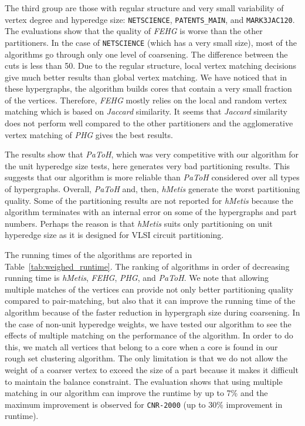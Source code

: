 \documentclass[twocolumn]{svjour3}          \smartqed
\begin{document}
The third group are those with regular structure and very small variability of vertex degree and hyperedge size: \texttt{NETSCIENCE}, \texttt{PATENTS\_MAIN}, and \texttt{MARK3JAC120}. The evaluations show that the quality of \textit{FEHG} is worse than the other partitioners. In the case of \texttt{NETSCIENCE} (which has a very small size), most of the algorithms go through only one level of coarsening. The difference between the cuts is less than 50. Due to the regular structure, local vertex matching decisions give much better results than global vertex matching. We have noticed that in these hypergraphs, the algorithm builds cores that contain a very small fraction of the vertices. Therefore, \textit{FEHG} mostly relies on the local and random vertex matching which is based on \textit{Jaccard} similarity. It seems that \textit{Jaccard} similarity does not perform well compared to the other partitioners and the agglomerative vertex matching of \textit{PHG} gives the best results. 

The results show that \textit{PaToH}, which was very competitive with our algorithm for the unit hyperedge size tests, here generates very bad partitioning results. This suggests that our algorithm is more reliable than \textit{PaToH} considered over all types of hypergraphs. Overall, \textit{PaToH} and, then, \textit{hMetis} generate the worst partitioning quality. Some of the partitioning results are not reported for \textit{hMetis} because the algorithm  terminates with an internal error on some of the hypergraphs and part numbers. Perhaps the reason is that \textit{hMetis} suits only partitioning on unit hyperedge size as it is designed for VLSI circuit partitioning.


The running times of the algorithms are reported in Table~\ref{tab:weighed_runtime}. The ranking of algorithms in order of decreasing running time is \textit{hMetis}, \textit{FEHG}, \textit{PHG}, and \textit{PaToH}. 
We note that allowing multiple matches of the vertices can provide not only better partitioning quality compared to pair-matching, but also that it can improve the running time of the algorithm because of the faster reduction in hypergraph size during coarsening. In the case of non-unit hyperedge weights, we have tested our algorithm to see the effects of multiple matching on the performance of the algorithm. In order to do this, we match all vertices that belong to a core when a core is found in our rough set clustering algorithm. The only limitation is that we do not allow the weight of a coarser vertex to exceed the size of a part because it makes it difficult to maintain the balance constraint. The evaluation shows that using multiple matching in our algorithm can improve the runtime by up to 7\% and the maximum improvement is observed for \texttt{CNR-2000} (up to 30\% improvement in runtime). 
\end{document}
